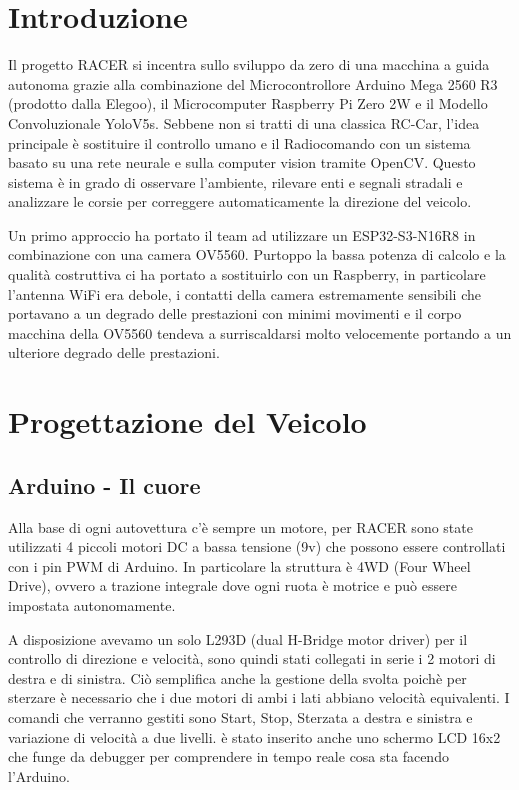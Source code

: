 \documentclass{article}
\begin{document}
\newpage    

\tableofcontents

\newpage    

\section{Introduzione}
    Il progetto RACER si incentra sullo sviluppo da zero di una macchina a guida autonoma grazie alla combinazione del Microcontrollore \cite{arduinomega}
    Arduino Mega 2560 R3 (prodotto dalla Elegoo), il Microcomputer \cite{pizero} Raspberry Pi Zero 2W e il Modello Convoluzionale \cite{yolo} YoloV5s. 
    Sebbene non si tratti di una classica RC-Car, l'idea principale è sostituire il controllo umano e il Radiocomando con un sistema basato su una rete neurale e sulla computer vision tramite OpenCV. Questo sistema è in grado di osservare l'ambiente, rilevare enti e segnali stradali e analizzare le corsie per correggere automaticamente la direzione del veicolo.

    Un primo approccio ha portato il team ad utilizzare un ESP32-S3-N16R8 in combinazione con una camera OV5560. Purtoppo la bassa potenza di calcolo e la qualità costruttiva ci ha portato a sostituirlo con un Raspberry, in particolare l'antenna WiFi era debole, i contatti della camera estremamente sensibili che portavano a un degrado delle prestazioni con minimi movimenti e il corpo macchina della OV5560 tendeva a surriscaldarsi molto velocemente portando a un ulteriore degrado delle prestazioni.


\section{Progettazione del Veicolo}

\subsection{Arduino - Il cuore}

Alla base di ogni autovettura c'è sempre un motore, per RACER sono state utilizzati 4 piccoli motori DC a bassa tensione (9v) che possono essere controllati con i pin PWM di Arduino. In particolare la struttura è 4WD (Four Wheel Drive), ovvero a trazione integrale dove ogni ruota è motrice e può essere impostata autonomamente.

A disposizione avevamo un solo L293D (dual H-Bridge motor driver) per il controllo di direzione e velocità, sono quindi stati collegati in serie i 2 motori di destra e di sinistra. Ciò semplifica anche la gestione della svolta poichè per sterzare è necessario che i due motori di ambi i lati abbiano velocità equivalenti. I comandi che verranno gestiti sono Start, Stop, Sterzata a destra e sinistra e variazione di velocità a due livelli.
è stato inserito anche uno schermo LCD 16x2 che funge da debugger per comprendere in tempo reale cosa sta facendo l'Arduino.
\end{document}
